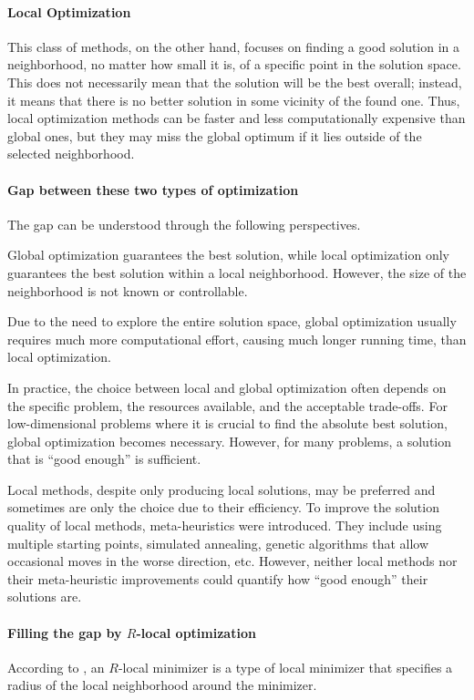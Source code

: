 \documentclass[sn-mathphys,Numbered]{sn-jnl}
\theoremstyle{thmstyleone}
\theoremstyle{thmstyletwo}
\theoremstyle{thmstylethree}
\begin{document}
\paragraph{Local Optimization} This class of methods, on the other hand, focuses on finding a good solution in a neighborhood, no matter how small it is, of a specific point in the solution space. This does not necessarily mean that the solution will be the best overall; instead, it means that there is no better solution in some vicinity of the found one. Thus, local optimization methods can be faster and less computationally expensive than global ones, but they may miss the global optimum if it lies outside of the selected neighborhood.

\paragraph{Gap between these two types of optimization} The gap can be understood through the following perspectives.

Global optimization guarantees the best solution, while local optimization only guarantees the best solution within a local neighborhood. However, the size of the neighborhood is not known or controllable.

Due to the need to explore the entire solution space, global optimization usually requires much more computational effort, causing much longer running time, than local optimization.

In practice, the choice between local and global optimization often depends on the specific problem, the resources available, and the acceptable trade-offs. For low-dimensional problems where it is crucial to find the absolute best solution, global optimization becomes necessary. However, for many problems, a solution that is ``good enough'' is sufficient. 

Local methods, despite only producing local solutions, may be preferred and sometimes are only the choice due to their efficiency. 
To improve the solution quality of local methods, meta-heuristics were introduced. They include using multiple starting points, simulated annealing, genetic algorithms that allow occasional moves in the worse direction, etc.
However, neither local methods nor their meta-heuristic improvements could quantify how ``good enough'' their solutions are.

\paragraph{Filling the gap by $R$-local optimization}
According to \cite{chen2019run}, 
an $R$-local minimizer is a type of local minimizer that specifies a radius of the local neighborhood around the minimizer.
\end{document}
